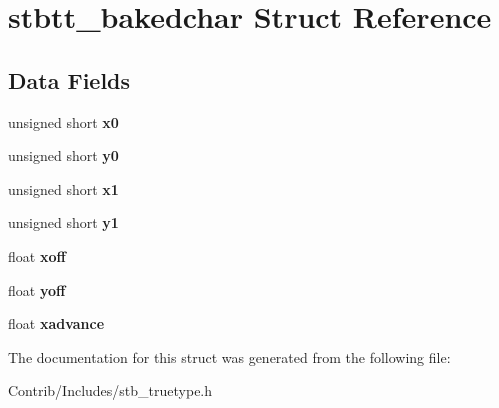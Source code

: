 \hypertarget{structstbtt__bakedchar}{}\section{stbtt\+\_\+bakedchar Struct Reference}
\label{structstbtt__bakedchar}
\subsection*{Data Fields}
\begin{DoxyCompactItemize}
\item 
unsigned short {\bfseries x0}\hypertarget{structstbtt__bakedchar_a34bbeb76596f15e30c090940f9180045}{}\label{structstbtt__bakedchar_a34bbeb76596f15e30c090940f9180045}

\item 
unsigned short {\bfseries y0}\hypertarget{structstbtt__bakedchar_a6fc66e7135d545972a4d23ca508518ca}{}\label{structstbtt__bakedchar_a6fc66e7135d545972a4d23ca508518ca}

\item 
unsigned short {\bfseries x1}\hypertarget{structstbtt__bakedchar_a2ecc279b91e1af05c2b567877472386d}{}\label{structstbtt__bakedchar_a2ecc279b91e1af05c2b567877472386d}

\item 
unsigned short {\bfseries y1}\hypertarget{structstbtt__bakedchar_a7a8fb143bd64d6acc43ced31524c7988}{}\label{structstbtt__bakedchar_a7a8fb143bd64d6acc43ced31524c7988}

\item 
float {\bfseries xoff}\hypertarget{structstbtt__bakedchar_a8302327b90467cf4f871e69336f70e38}{}\label{structstbtt__bakedchar_a8302327b90467cf4f871e69336f70e38}

\item 
float {\bfseries yoff}\hypertarget{structstbtt__bakedchar_a50ed8dbcec3656a6fa7d69e3ef123260}{}\label{structstbtt__bakedchar_a50ed8dbcec3656a6fa7d69e3ef123260}

\item 
float {\bfseries xadvance}\hypertarget{structstbtt__bakedchar_afaf39abf01508aa37aef751d60989069}{}\label{structstbtt__bakedchar_afaf39abf01508aa37aef751d60989069}

\end{DoxyCompactItemize}


The documentation for this struct was generated from the following file\+:\begin{DoxyCompactItemize}
\item 
Contrib/\+Includes/stb\+\_\+truetype.\+h\end{DoxyCompactItemize}
